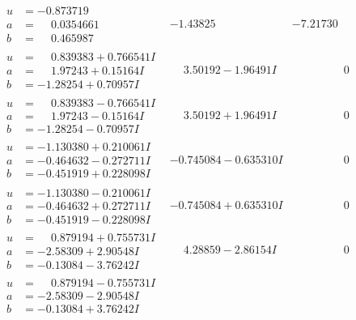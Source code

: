\documentclass[1p]{elsarticle_modified}
\theoremstyle{definition}
\begin{document}
$$\begin{array}{c|c|c}
\begin{aligned}
u &= -0.873719\phantom{ +0.000000I} \\
a &= \phantom{-}0.0354661\phantom{ +0.000000I} \\
b &= \phantom{-}0.465987\phantom{ +0.000000I}\end{aligned}
 & -1.43825\phantom{ +0.000000I} & -7.21730\phantom{ +0.000000I} \\ \hline\begin{aligned}
u &= \phantom{-}0.839383 + 0.766541 I \\
a &= \phantom{-}1.97243 + 0.15164 I \\
b &= -1.28254 + 0.70957 I\end{aligned}
 & \phantom{-}3.50192 - 1.96491 I & \phantom{-0.000000 } 0 \\ \hline\begin{aligned}
u &= \phantom{-}0.839383 - 0.766541 I \\
a &= \phantom{-}1.97243 - 0.15164 I \\
b &= -1.28254 - 0.70957 I\end{aligned}
 & \phantom{-}3.50192 + 1.96491 I & \phantom{-0.000000 } 0 \\ \hline\begin{aligned}
u &= -1.130380 + 0.210061 I \\
a &= -0.464632 - 0.272711 I \\
b &= -0.451919 + 0.228098 I\end{aligned}
 & -0.745084 - 0.635310 I & \phantom{-0.000000 } 0 \\ \hline\begin{aligned}
u &= -1.130380 - 0.210061 I \\
a &= -0.464632 + 0.272711 I \\
b &= -0.451919 - 0.228098 I\end{aligned}
 & -0.745084 + 0.635310 I & \phantom{-0.000000 } 0 \\ \hline\begin{aligned}
u &= \phantom{-}0.879194 + 0.755731 I \\
a &= -2.58309 + 2.90548 I \\
b &= -0.13084 - 3.76242 I\end{aligned}
 & \phantom{-}4.28859 - 2.86154 I & \phantom{-0.000000 } 0 \\ \hline\begin{aligned}
u &= \phantom{-}0.879194 - 0.755731 I \\
a &= -2.58309 - 2.90548 I \\
b &= -0.13084 + 3.76242 I\end{aligned}

\end{array}$$
\end{document}
